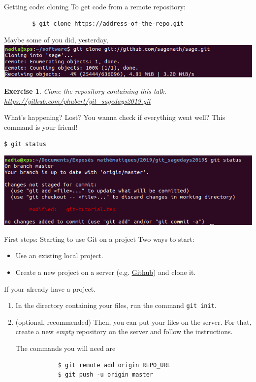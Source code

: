 \documentclass{beamer}
\newcommand{\cmd}[1]{\fbox{\color{black}\texttt{#1}}}
\newtheorem{exo}{Exercise}
\begin{document}
	\begin{frame}[fragile]{Getting code: cloning \hfill \cmd{clone}}
		To get code from a remote repository:
		\begin{verbatim}
		$ git clone https://address-of-the-repo.git
		\end{verbatim}
		Maybe some of you did, yesterday,
		\includegraphics[width=\linewidth]{clone}
		\pause
		\begin{exo}
			Clone the repository containing this talk.
			\url{https://github.com/phubert/git_sagedays2019.git}
		\end{exo}
	\end{frame}

	\begin{frame}[fragile]{What's happening?\hfill \cmd{status}}
		Lost? You wanna check if everything went well? This command is your friend!
		\begin{verbatim}
$ git status
		\end{verbatim}
		\begin{center}
			\includegraphics[width=\linewidth]{status}
		\end{center}
	\end{frame}

	\begin{frame}[fragile]{First steps: Starting to use Git on a project\hfill \cmd{init}}
		Two ways to start: 
		\begin{itemize}
			\item Use an existing local project.
			\item Create a new project on a server (e.g. \href{https://github.com/}{Github}) and clone it. \newline
		\end{itemize}
	
		If your already have a project.
		\begin{enumerate}
		\item  In the directory containing your files, run the command 
		\mbox{\texttt{git init}}.
		
		\item  (optional, recommended) Then, you can put your files on the server. For that, create a new \emph{empty} repository on the server and follow the instructions.
		
		The commands you will need are 
		\begin{verbatim}
			$ git remote add origin REPO_URL
			$ git push -u origin master
		\end{verbatim}
		
		\end{enumerate}   
	\end{frame}
\end{document}
